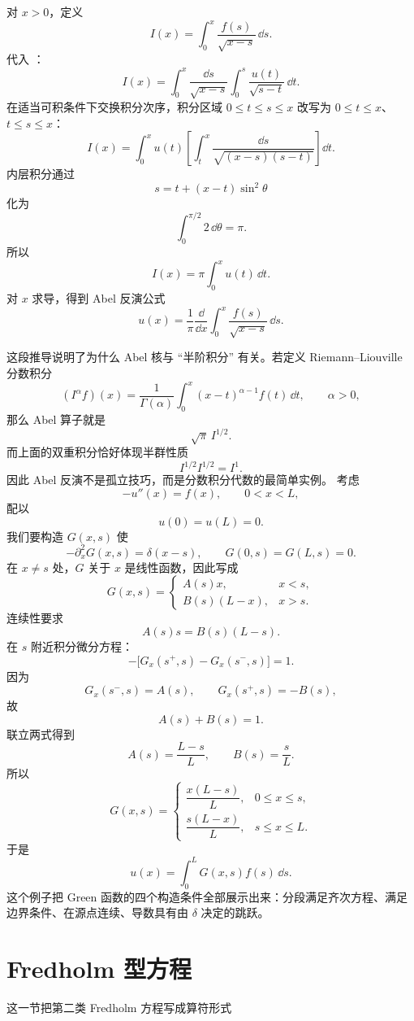 对 $x>0$，定义
\[
I(x)=\int_0^x\frac{f(s)}{\sqrt{x-s}}\,\dd s.
\]
代入 ：
\[
I(x)=\int_0^x\frac{\dd s}{\sqrt{x-s}}
\int_0^s\frac{u(t)}{\sqrt{s-t}}\,\dd t.
\]
在适当可积条件下交换积分次序，积分区域 $0\le t\le s\le x$ 改写为 $0\le t\le x$、$t\le s\le x$：
\[
I(x)=\int_0^xu(t)
\left[
\int_t^x\frac{\dd s}{\sqrt{(x-s)(s-t)}}
\right]\dd t.
\]
内层积分通过
\[
s=t+(x-t)\sin^2\theta
\]
化为
\[
\int_0^{\pi/2}2\,\dd\theta=\pi.
\]
所以
\[
I(x)=\pi\int_0^xu(t)\,\dd t.
\]
对 $x$ 求导，得到 Abel 反演公式
\begin{equation*}\boxed{
u(x)=\frac1\pi\frac{\dd}{\dd x}
\int_0^x\frac{f(s)}{\sqrt{x-s}}\,\dd s
}.\end{equation*}

这段推导说明了为什么 Abel 核与 ``半阶积分'' 有关。若定义 Riemann--Liouville 分数积分
\[
(I^\alpha f)(x)
=\frac1{\Gamma(\alpha)}
\int_0^x(x-t)^{\alpha-1}f(t)\,\dd t,
\qquad \alpha>0,
\]
那么 Abel 算子就是
\[
\sqrt\pi\,I^{1/2}.
\]
而上面的双重积分恰好体现半群性质
\[
I^{1/2}I^{1/2}=I^1.
\]
因此 Abel 反演不是孤立技巧，而是分数积分代数的最简单实例。
考虑
\[
-u''(x)=f(x),
\qquad 0<x<L,
\]
配以
\[
u(0)=u(L)=0.
\]
我们要构造 $G(x,s)$ 使
\[
-\partial_x^2G(x,s)=\delta(x-s),
\qquad
G(0,s)=G(L,s)=0.
\]
在 $x\neq s$ 处，$G$ 关于 $x$ 是线性函数，因此写成
\[
G(x,s)=
\begin{cases}
A(s)x,&x<s,\\
B(s)(L-x),&x>s.
\end{cases}
\]
连续性要求
\[
A(s)s=B(s)(L-s).
\]
在 $s$ 附近积分微分方程：
\[
-\bigl[G_x(s^+,s)-G_x(s^-,s)\bigr]=1.
\]
因为
\[
G_x(s^-,s)=A(s),
\qquad
G_x(s^+,s)=-B(s),
\]
故
\[
A(s)+B(s)=1.
\]
联立两式得到
\[
A(s)=\frac{L-s}{L},
\qquad
B(s)=\frac{s}{L}.
\]
所以
\begin{equation*}\boxed{
G(x,s)=
\begin{cases}
\dfrac{x(L-s)}{L},&0\le x\le s,\\[5pt]
\dfrac{s(L-x)}{L},&s\le x\le L.
\end{cases}
}\end{equation*}
于是
\[
u(x)=\int_0^LG(x,s)f(s)\,\dd s.
\]
这个例子把 Green 函数的四个构造条件全部展示出来：分段满足齐次方程、满足边界条件、在源点连续、导数具有由 $\delta$ 决定的跳跃。

\section{Fredholm 型方程}
\label{sec:fredholm}

这一节把第二类 Fredholm 方程写成算符形式

